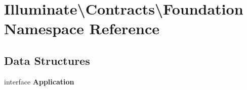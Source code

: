 \section{Illuminate\textbackslash{}Contracts\textbackslash{}Foundation Namespace Reference}
\label{namespace_illuminate_1_1_contracts_1_1_foundation}
\subsection*{Data Structures}
\begin{DoxyCompactItemize}
\item 
interface {\bf Application}
\end{DoxyCompactItemize}

